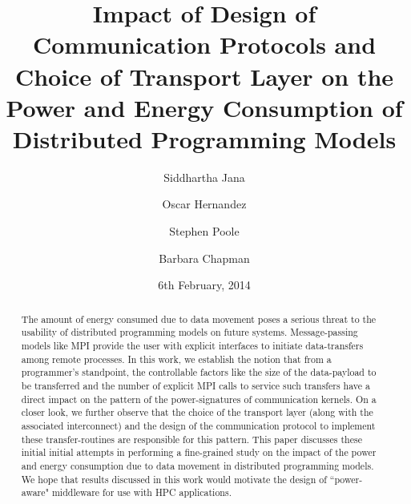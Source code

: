\documentclass{llncs}
\begin{document}
\title{Impact of Design of Communication Protocols and
Choice of Transport Layer on the Power and Energy
Consumption of Distributed Programming Models}

\author{ Siddhartha Jana \and  Oscar Hernandez  \and Stephen Poole \and Barbara Chapman}

\date{6th February, 2014}
\maketitle

\begin{abstract}

    The amount of energy consumed due to data movement
    poses a serious threat to the usability of
    distributed programming models on future systems.
    Message-passing models like MPI provide the user
    with explicit interfaces to initiate data-transfers
    among remote processes.  In this work, we establish
    the notion that from a programmer's standpoint, the
    controllable factors like the size of the
    data-payload to be transferred and the number of
    explicit MPI calls to service such transfers have a
    direct impact on the pattern of the
    power-signatures of communication kernels.  On a
    closer look, we further observe that the choice of
    the transport layer (along with the associated
    interconnect) and the design of the communication
    protocol to implement these transfer-routines are
    responsible for this pattern.  This paper discusses
    these initial initial attempts in performing a
    fine-grained study on the impact of the power and
    energy consumption due to data movement in
    distributed programming models.  We hope that
    results discussed in this work would motivate the
    design of ``power-aware" middleware for use with
    HPC applications.

\end{abstract}
\end{document}
